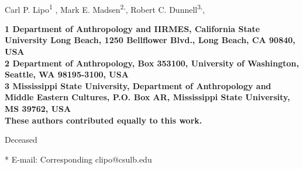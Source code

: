\documentclass[10pt,letterpaper]{article}
\date{}
\begin{document}
\vspace*{0.35in}

\begin{flushleft}
{\Large
\textbf{}
}
\newline
\\
Carl P. Lipo\textsuperscript{1 \Yinyang},
Mark E. Madsen\textsuperscript{2,\Yinyang},
Robert C. Dunnell\textsuperscript{3,\dag},

\bf{1} Department of Anthropology and IIRMES, California State University Long Beach, 1250 Bellflower Blvd., Long Beach, CA 90840, USA
\\
\bf{2} Department of Anthropology, Box 353100, University of Washington, Seattle, WA 98195-3100, USA
\\
\bf{3} Mississippi State University, Department of Anthropology and Middle Eastern Cultures, P.O. Box AR, Mississippi State University, MS 39762, USA
\\


% 
%
\Yinyang These authors contributed equally to this work.



\dag Deceased


* E-mail: Corresponding clipo@csulb.edu
\end{flushleft}
\end{document}
